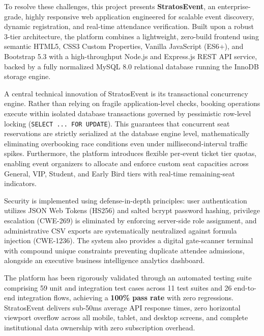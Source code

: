 \documentclass[11pt,a4paper]{report}
\begin{document}
\vspace{0.15in}
\noindent
To resolve these challenges, this project presents \textbf{StratosEvent}, an enterprise-grade, highly responsive web application engineered for scalable event discovery, dynamic registration, and real-time attendance verification. Built upon a robust 3-tier architecture, the platform combines a lightweight, zero-build frontend using semantic HTML5, CSS3 Custom Properties, Vanilla JavaScript (ES6+), and Bootstrap 5.3 with a high-throughput Node.js and Express.js REST API service, backed by a fully normalized MySQL 8.0 relational database running the InnoDB storage engine.

\vspace{0.15in}
\noindent
A central technical innovation of StratosEvent is its transactional concurrency engine. Rather than relying on fragile application-level checks, booking operations execute within isolated database transactions governed by pessimistic row-level locking (\texttt{SELECT ... FOR UPDATE}). This guarantees that concurrent seat reservations are strictly serialized at the database engine level, mathematically eliminating overbooking race conditions even under millisecond-interval traffic spikes. Furthermore, the platform introduces flexible per-event ticket tier quotas, enabling event organizers to allocate and enforce custom seat capacities across General, VIP, Student, and Early Bird tiers with real-time remaining-seat indicators.

\vspace{0.15in}
\noindent
Security is implemented using defense-in-depth principles: user authentication utilizes JSON Web Tokens (HS256) and salted bcrypt password hashing, privilege escalation (CWE-269) is eliminated by enforcing server-side role assignment, and administrative CSV exports are systematically neutralized against formula injection (CWE-1236). The system also provides a digital gate-scanner terminal with compound unique constraints preventing duplicate attendee admissions, alongside an executive business intelligence analytics dashboard.

\vspace{0.15in}
\noindent
The platform has been rigorously validated through an automated testing suite comprising 59 unit and integration test cases across 11 test suites and 26 end-to-end integration flows, achieving a \textbf{100\% pass rate} with zero regressions. StratosEvent delivers sub-50ms average API response times, zero horizontal viewport overflow across all mobile, tablet, and desktop screens, and complete institutional data ownership with zero subscription overhead.
\end{document}
